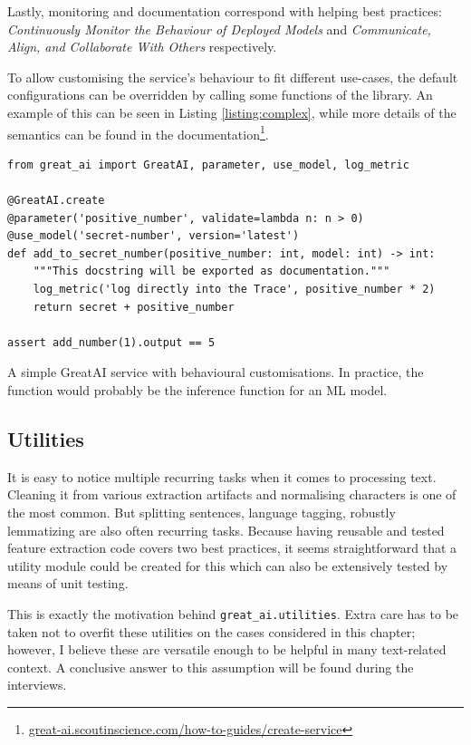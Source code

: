 Lastly, monitoring and documentation correspond with helping best practices: \textit{Continuously Monitor the Behaviour of Deployed Models} and \textit{Communicate, Align, and Collaborate With Others} respectively.

To allow customising the service's behaviour to fit different use-cases, the default configurations can be overridden by calling some functions of the library. An example of this can be seen in Listing \ref{listing:complex}, while more details of the semantics can be found in the documentation\footnote{\href{https://great-ai.scoutinscience.com/how-to-guides/create-service/}{great-ai.scoutinscience.com/how-to-guides/create-service}}.

\begin{listing}[!ht]
\begin{verbatim}
from great_ai import GreatAI, parameter, use_model, log_metric

@GreatAI.create
@parameter('positive_number', validate=lambda n: n > 0)
@use_model('secret-number', version='latest')
def add_to_secret_number(positive_number: int, model: int) -> int:
    """This docstring will be exported as documentation."""
    log_metric('log directly into the Trace', positive_number * 2)
    return secret + positive_number

assert add_number(1).output == 5
\end{verbatim}
\caption{A simple GreatAI service with behavioural customisations. In practice, the function would probably be the inference function for an ML model.}
\label{listing:complex}
\end{listing}

\subsection{Utilities}

It is easy to notice multiple recurring tasks when it comes to processing text. Cleaning it from various extraction artifacts and normalising characters is one of the most common. But splitting sentences, language tagging, robustly lemmatizing are also often recurring tasks. Because having reusable and tested feature extraction code covers two best practices, it seems straightforward that a utility module could be created for this which can also be extensively tested by means of unit testing.

This is exactly the motivation behind \texttt{great\_ai.utilities}. Extra care has to be taken not to overfit these utilities on the cases considered in this chapter; however, I believe these are versatile enough to be helpful in many text-related context. A conclusive answer to this assumption will be found during the interviews.

